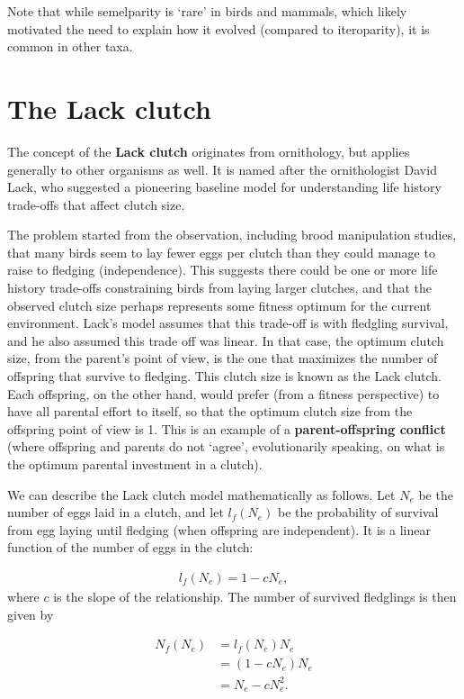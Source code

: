 \documentclass[
]{book}
\begin{document}
Note that while semelparity is `rare' in birds and mammals, which likely motivated the need to explain how it evolved (compared to iteroparity), it is common in other taxa.

\hypertarget{the-lack-clutch}{%
\section{The Lack clutch}\label{the-lack-clutch}}

The concept of the \textbf{Lack clutch} originates from ornithology, but applies generally to other organisms as well. It is named after the ornithologist David Lack, who suggested a pioneering baseline model for understanding life history trade-offs that affect clutch size.

The problem started from the observation, including brood manipulation studies, that many birds seem to lay fewer eggs per clutch than they could manage to raise to fledging (independence). This suggests there could be one or more life history trade-offs constraining birds from laying larger clutches, and that the observed clutch size perhaps represents some fitness optimum for the current environment. Lack's model assumes that this trade-off is with fledgling survival, and he also assumed this trade off was linear. In that case, the optimum clutch size, from the parent's point of view, is the one that maximizes the number of offspring that survive to fledging. This clutch size is known as the Lack clutch. Each offspring, on the other hand, would prefer (from a fitness perspective) to have all parental effort to itself, so that the optimum clutch size from the offspring point of view is 1. This is an example of a \textbf{parent-offspring conflict} (where offspring and parents do not `agree', evolutionarily speaking, on what is the optimum parental investment in a clutch).

We can describe the Lack clutch model mathematically as follows. Let \(N_e\) be the number of eggs laid in a clutch, and let \(l_f(N_e)\) be the probability of survival from egg laying until fledging (when offspring are independent). It is a linear function of the number of eggs in the clutch:

\begin{align}
l_f(N_e)=1-cN_e,
\end{align}
where \(c\) is the slope of the relationship. The number of survived fledglings is then given by

\begin{align}
N_f(N_e)&=l_f(N_e)N_e\\
&=(1-cN_e)N_e\\
&=N_e-cN_e^2.
\end{align}
\end{document}
